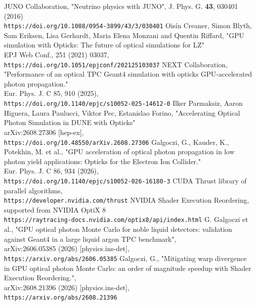 \documentclass{webofc}
\begin{document}
\begin{thebibliography}{}
JUNO Collaboration, "Neutrino physics with JUNO",
J. Phys. G. {\bf 43}, 030401 (2016)\\
\texttt{https://doi.org/10.1088/0954-3899/43/3/030401}
%
Oisín Creaner, Simon Blyth, Sam Eriksen, Lisa Gerhardt, Maria Elena Monzani and Quentin Riffard,
"GPU simulation with Opticks: The future of optical simulations for LZ" \\
EPJ Web Conf., 251 (2021) 03037,\\
\texttt{https://doi.org/10.1051/epjconf/202125103037}
%
NEXT Collaboration, "Performance of an optical TPC Geant4 simulation with opticks GPU-accelerated photon propagation."\\
Eur. Phys. J. C 85, 910 (2025),\\
\texttt{https://doi.org/10.1140/epjc/s10052-025-14612-0}
%
Ilker Parmaksiz, Aaron Higuera, Laura Paulucci, Viktor Pec, Estanislao Forino,
"Accelerating Optical Photon Simulation in DUNE with Opticks"\\
arXiv:2608.27306 [hep-ex],\\
\texttt{https://doi.org/10.48550/arXiv.2608.27306}
%
Galgoczi, G., Kauder, K., Potekhin, M. et al.,
"GPU acceleration of optical photon propagation in low photon yield applications: Opticks for the Electron Ion Collider."\\
Eur. Phys. J. C 86, 934 (2026),\\
\texttt{https://doi.org/10.1140/epjc/s10052-026-16180-3}
%
%
CUDA Thrust library of parallel algorithms,\\
\texttt{https://developer.nvidia.com/thrust}
%
%
NVIDIA Shader Execution Reordering, supported from NVIDIA OptiX 8\\
\texttt{https://raytracing-docs.nvidia.com/optix8/api/index.html}
%
G. Galgoczi et al., "GPU optical photon Monte Carlo for noble liquid detectors: validation against Geant4 in a large liquid argon TPC benchmark",\\
arXiv:2606.05385 (2026)  [physics.ins-det],\\
\texttt{https://arxiv.org/abs/2606.05385}
%
%
Galgoczi, G., "Mitigating warp divergence in GPU optical photon Monte Carlo: an order of magnitude speedup with Shader Execution Reordering.",\\
arXiv:2608.21396 (2026) [physics.ins-det],\\
\texttt{https://arxiv.org/abs/2608.21396}
%
%
%
\end{thebibliography}
%
\end{document}
